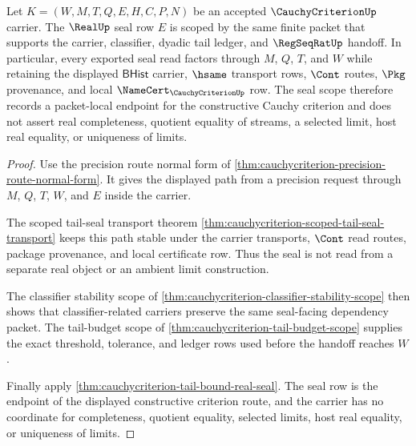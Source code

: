 \begin{theorem}
\label{thm:cauchycriterion-real-seal-scope}
Let $K=(W,M,T,Q,E,H,C,P,N)$ be an accepted $\CauchyCriterionUp$ carrier. The $\RealUp$ seal row $E$ is scoped by the same finite packet that supports the carrier, classifier, dyadic tail ledger, and $\RegSeqRatUp$ handoff. In particular, every exported seal read factors through $M$, $Q$, $T$, and $W$ while retaining the displayed $\mathsf{BHist}$ carrier, $\hsame$ transport rows, $\Cont$ routes, $\Pkg$ provenance, and local $\NameCert_{\CauchyCriterionUp}$ row. The seal scope therefore records a packet-local endpoint for the constructive Cauchy criterion and does not assert real completeness, quotient equality of streams, a selected limit, host real equality, or uniqueness of limits.
\end{theorem}
\begin{proof}
Use the precision route normal form of \autoref{thm:cauchycriterion-precision-route-normal-form}. It gives the displayed path from a precision request through $M$, $Q$, $T$, $W$, and $E$ inside the carrier.

The scoped tail-seal transport theorem \autoref{thm:cauchycriterion-scoped-tail-seal-transport} keeps this path stable under the carrier transports, $\Cont$ read routes, package provenance, and local certificate row. Thus the seal is not read from a separate real object or an ambient limit construction.

The classifier stability scope of \autoref{thm:cauchycriterion-classifier-stability-scope} then shows that classifier-related carriers preserve the same seal-facing dependency packet. The tail-budget scope of \autoref{thm:cauchycriterion-tail-budget-scope} supplies the exact threshold, tolerance, and ledger rows used before the handoff reaches $W$.

Finally apply \autoref{thm:cauchycriterion-tail-bound-real-seal}. The seal row is the endpoint of the displayed constructive criterion route, and the carrier has no coordinate for completeness, quotient equality, selected limits, host real equality, or uniqueness of limits.
\end{proof}

